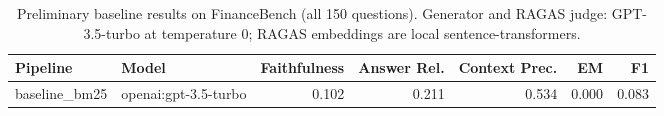 \begin{table}[t]
\centering
\caption{Preliminary baseline results on FinanceBench (all 150 questions). Generator and RAGAS judge: GPT-3.5-turbo at temperature 0; RAGAS embeddings are local sentence-transformers.}
\label{tab:prelim-results}
\begin{tabular}{llrrrrr}
\toprule
Pipeline & Model & Faithfulness & Answer Rel. & Context Prec. & EM & F1 \\
\midrule
baseline\_bm25 & openai:gpt-3.5-turbo & 0.102 & 0.211 & 0.534 & 0.000 & 0.083 \\
\bottomrule
\end{tabular}
\end{table}
